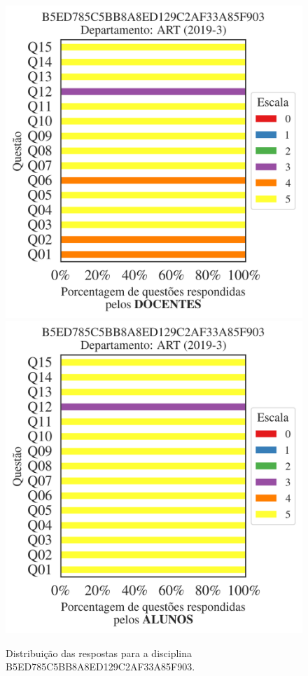 \documentclass[a4paper,10pt]{article}
\begin{document}
\begin{figure}[h]
\centering
\includegraphics[width=0.485\linewidth]{analise_disciplina_departamento_ART_B5ED785C5BB8A8ED129C2AF33A85F903_docentes.png}
\includegraphics[width=0.485\linewidth]{analise_disciplina_departamento_ART_B5ED785C5BB8A8ED129C2AF33A85F903_alunos.png}
\caption{\label{fig:analise_geral_departamento}                Distribuição das respostas para a disciplina B5ED785C5BB8A8ED129C2AF33A85F903. }
\end{figure}
\end{document}
